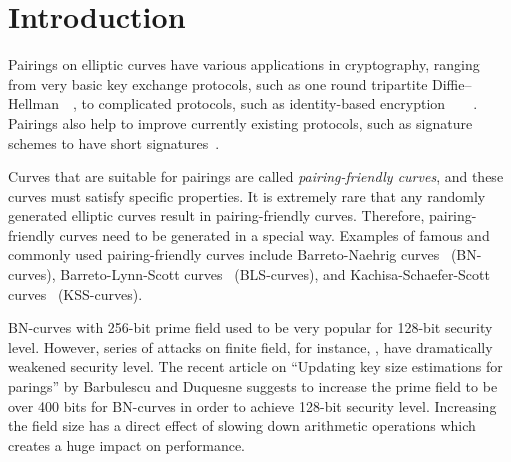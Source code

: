 %
%
%
%
%
%
%
%
%
%

\section{Introduction}

Pairings on elliptic curves have various applications in cryptography,
ranging from very basic key exchange protocols,
such as one round tripartite Diffie--Hellman~\cite{2000/joux-ants}~\cite{2004/joux-tripartite},
to complicated protocols, such as
identity-based encryption~\cite{2001/boneh}~\cite{2002/horwitz}~\cite{2002/gentry}~\cite{2005/sahai}.
Pairings also help to improve currently existing protocols, 
such as signature schemes to have short signatures~\cite{2004/boneh}.

Curves that are suitable for pairings are called {\emph{pairing-friendly curves}},
and these curves must satisfy specific properties.
It is extremely rare that any randomly generated elliptic curves result in pairing-friendly curves.
Therefore, pairing-friendly curves need to be generated in a special way.
Examples of famous and commonly used pairing-friendly curves include 
Barreto-Naehrig curves~\cite{2006/barreto} (BN-curves),
Barreto-Lynn-Scott curves~\cite{2003/bls} (BLS-curves), and
Kachisa-Schaefer-Scott curves~\cite{2008/kss} (KSS-curves).

BN-curves with 256-bit prime field used to be very popular for 128-bit security level.
However, series of attacks on finite field, for instance,
\cite{2016/KB} \cite{2015/BGGM} \cite{2015/BGK},
have dramatically weakened security level.
The recent article on ``Updating key size estimations for parings'' by Barbulescu and Duquesne \cite{2017/keysize}
suggests to increase the prime field to be over 400 bits for BN-curves in order to achieve 128-bit security level.
Increasing the field size has a direct effect of slowing down arithmetic operations which creates a huge impact on performance.

